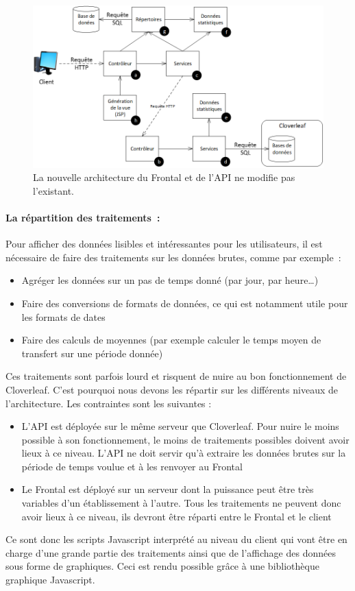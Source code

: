 			\begin{figure}[H]
				\centering
				\includegraphics[width=16cm]{../img/part3/archi_stats.png}
				\caption{\label{archi_stats} La nouvelle architecture du Frontal et de
				l'API ne modifie pas l'existant.}
			\end{figure}
			
			\paragraph{La répartition des traitements~:}
			Pour afficher des données lisibles et intéressantes pour les utilisateurs, il
			est nécessaire de faire des traitements sur les données brutes, comme par
			exemple~:
			\begin{itemize}
			  \item Agréger les données sur un pas de temps donné (par jour, par heure\ldots)
			  \item Faire des conversions de formats de données, ce qui est notamment
			  utile pour les formats de dates
			  \item Faire des calculs de moyennes (par exemple calculer le temps moyen de
			  transfert sur une période donnée)
			\end{itemize}
			Ces traitements sont parfois lourd et risquent de nuire au bon fonctionnement
			de Cloverleaf. C'est pourquoi nous devons les répartir sur les différents
			niveaux de l'architecture. Les contraintes sont les suivantes :
			\begin{itemize}
			  \item L'API est déployée sur le même serveur que Cloverleaf. Pour nuire le
			  moins possible à son fonctionnement, le moins de traitements possibles
			  doivent avoir lieux à ce niveau. L'API ne doit servir qu'à extraire les
			  données brutes sur la période de temps voulue et à les renvoyer au Frontal
			  \item Le Frontal est déployé sur un serveur dont la puissance peut être
			  très variables d'un établissement à l'autre. Tous les traitements ne
			  peuvent donc avoir lieux à ce niveau, ils devront être réparti entre le
			  Frontal et le client
			\end{itemize}
			Ce sont donc les scripts Javascript interprété au niveau du client qui vont
			être en charge d'une grande partie des traitements ainsi que de l'affichage
			des données sous forme de graphiques. Ceci est rendu possible grâce à une
			bibliothèque graphique Javascript.
			
